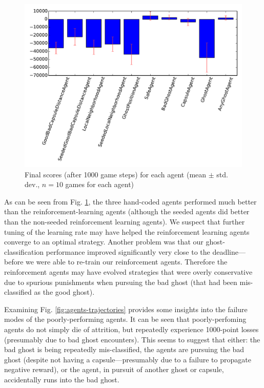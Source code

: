 \documentclass[11pt]{amsart}
\begin{document}
\begin{figure}
	\includegraphics[width=\textwidth]{agents-finals.pdf}
	\caption{Final scores (after 1000 game steps) for each agent (mean $\pm$ std. dev., $n = 10$ games for each agent)}
	\label{fig:agents-finals}
\end{figure}

As can be seen from Fig. \ref{fig:agents-finals}, the three hand-coded agents performed much better than the reinforcement-learning agents (although the seeded agents did better than the non-seeded reinforcement learning agents). We suspect that further tuning of the learning rate may have helped the reinforcement learning agents converge to an optimal strategy. Another problem was that our ghost-classification performance improved significantly very close to the deadline---before we were able to re-train our reinforcement agents. Therefore the reinforcement agents may have evolved strategies that were overly conservative due to spurious punishments when pursuing the bad ghost (that had been mis-classified as the good ghost).

Examining Fig. \ref{fig:agents-trajectories} provides some insights into the failure modes of the poorly-performing agents. It can be seen that poorly-perfoming agents do not simply die of attrition, but repeatedly experience 1000-point losses (presumably due to bad ghost encounters). This seems to suggest that either: the bad ghost is being repeatedly mis-classified, the agents are pursuing the bad ghost (despite not having a capsule---presumably due to a failure to propagate negative reward), or the agent, in pursuit of another ghost or capsule, accidentally runs into the bad ghost.
\end{document}
